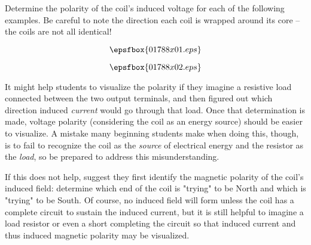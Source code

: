 

Determine the polarity of the coil's induced voltage for each of the following examples.  Be careful to note the direction each coil is wrapped around its core -- the coils are not all identical!

$$\epsfbox{01788x01.eps}$$







$$\epsfbox{01788x02.eps}$$







It might help students to visualize the polarity if they imagine a resistive load connected between the two output terminals, and then figured out which direction induced {\it current} would go through that load.  Once that determination is made, voltage polarity (considering the coil as an energy source) should be easier to visualize.  A mistake many beginning students make when doing this, though, is to fail to recognize the coil as the {\it source} of electrical energy and the resistor as the {\it load}, so be prepared to address this misunderstanding.

If this does not help, suggest they first identify the magnetic polarity of the coil's induced field: determine which end of the coil is "trying" to be North and which is "trying" to be South.  Of course, no induced field will form unless the coil has a complete circuit to sustain the induced current, but it is still helpful to imagine a load resistor or even a short completing the circuit so that induced current and thus induced magnetic polarity may be visualized.




